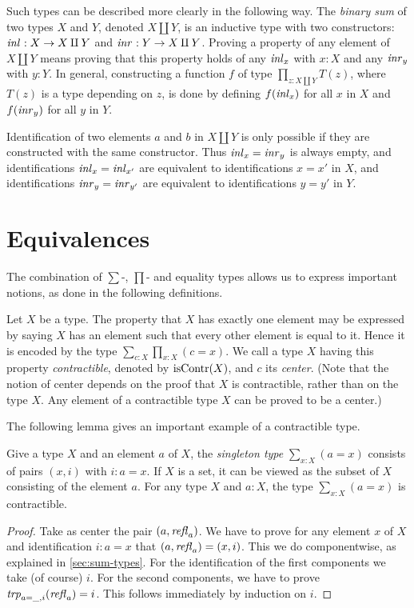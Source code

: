 Such types can be described more clearly in the following way.
The \emph{binary sum} of two types $X$ and $Y$, denoted $X \amalg Y$,
is an inductive type with two constructors: $\mathop{{\it inl}_{}} : X \to X \amalg Y$ and
$\mathop{{\it inr}_{}} : Y \to X \amalg Y$. Proving a property of any element of $X \amalg Y$
means proving that this property holds of any $\mathop{{\it inl}_{x}}$ with $x:X$ and any
$\mathop{{\it inr}_{y}}$ with $y:Y$. In general, constructing a function $f$ of type
$\prod_{z: X \amalg Y} T(z)$, where $T(z)$ is a type depending on 
$z$, is done by defining $f(\mathop{{\it inl}_{x}})$ for all $x$ in $X$
and $f(\mathop{{\it inr}_{y}})$ for all $y$ in $Y$.

Identification of two elements $a$ and $b$ in $X \amalg Y$ is 
only possible if they are constructed with the same constructor.
Thus $\mathop{{\it inl}_{x}} = \mathop{{\it inr}_{y}}$ is always empty, and identifications
$\mathop{{\it inl}_{x}} = \mathop{{\it inl}_{x'}}$ are equivalent to identifications $x=x'$ in $X$,
and identifications
$\mathop{{\it inr}_{y}} = \mathop{{\it inr}_{y'}}$ are equivalent to identifications $y=y'$ in $Y$.

\section{Equivalences}\label{sec:equivalence}


The combination of $\sum$-, $\prod$- and equality types allows
us to express important notions, as done in the following
definitions.

\begin{definition}
\label{def:contractible}
Let $X$ be a type. 
The property that $X$ has exactly one element may be expressed by saying $X$ has an element such that every other element is
equal to it.  Hence it is encoded by the type $\sum_{c:X} \prod_{x:X} (c=x)$.
We call a type $X$ having this property \emph{contractible}, 
denoted by $\mathrm{isContr}(X)$, and $c$ its \emph{center}. 
(Note that the notion of center depends on the proof that $X$
is contractible, rather than on the type $X$. 
Any element of a contractible type $X$ can be proved to be a center.) 
\end{definition}

The following lemma gives an important example of a contractible type.
\begin{lemma}\label{lem:thepathspaceiscontractible}
Give a type $X$ and an element $a$ of $X$, 
the \emph{singleton type} $\sum_{x:X} (a=x)$
consists of pairs $(x,i)$ with $i: a=x$. If $X$ is a set, it 
can be viewed as the subset of $X$ consisting of the element $a$.
For any type $X$ and $a:X$, the type $\sum_{x:X} (a=x)$ is contractible.
\end{lemma}
\begin{proof}
Take as center the pair $(a,\mathop{{\it refl}_{a}})$. We have
to prove for any element $x$ of $X$ and identification
$i: a=x$ that $(a,\mathop{{\it refl}_{a}}) = (x,i)$. This we do componentwise,
as explained in \cref{sec:sum-types}. For the identification of
the first components we take (of course) $i$. For the second
components, we have to prove $\mathord{\mathit{trp}}_{a=\_,i}(\mathop{{\it refl}_{a}})= i$.
This follows immediately by induction on $i$.
\end{proof}

